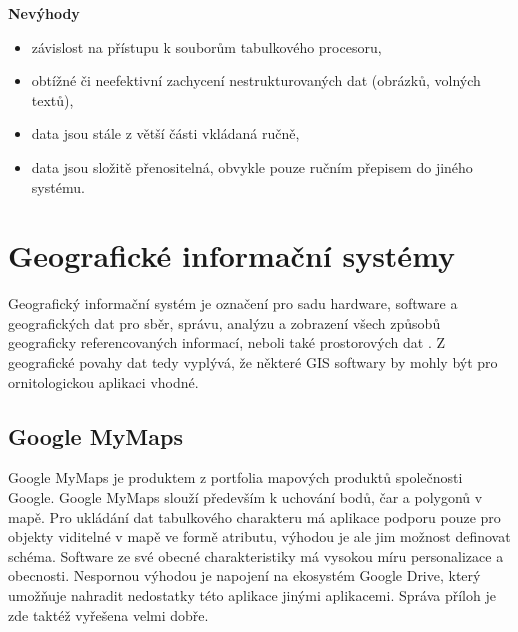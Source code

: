 \textbf{Nevýhody}
\nolisttopbreak
\begin{itemize}
	\item závislost na přístupu k souborům tabulkového procesoru,
	\item obtížné či neefektivní zachycení nestrukturovaných dat (obrázků, volných textů),
	\item data jsou stále z větší části vkládaná ručně,
	\item data jsou složitě přenositelná, obvykle pouze ručním přepisem do jiného systému.
\end{itemize}

\section{Geografické informační systémy}

Geografický informační systém je označení pro sadu hardware, software a geografických dat pro sběr, správu, analýzu a zobrazení všech způsobů geograficky referencovaných informací, neboli také prostorových dat \cite{gartnerGlossary}. Z geografické povahy dat tedy vyplývá, že některé GIS softwary by mohly být pro ornitologickou aplikaci vhodné. 

\subsection{Google MyMaps}

Google MyMaps je produktem z portfolia mapových produktů společnosti Google. Google MyMaps slouží především k uchování bodů, čar a polygonů v mapě. Pro ukládání dat tabulkového charakteru má aplikace podporu pouze pro objekty viditelné v mapě ve formě atributu, výhodou je ale jim možnost definovat schéma. Software ze své obecné charakteristiky má vysokou míru personalizace a obecnosti. Nespornou výhodou je napojení na ekosystém Google Drive, který umožňuje nahradit nedostatky této aplikace jinými aplikacemi. Správa příloh je zde taktéž vyřešena velmi dobře.

